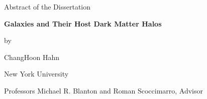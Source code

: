 \documentclass[12pt,letterpaper]{article}
\newcommand{\thesistitle}{Galaxies and Their Host Dark Matter Halos}
\newcommand{\thesisauthor}{ChangHoon Hahn}
\newcommand{\thesisadvisor}{Professors Michael R. Blanton and Roman Scoccimarro}
\begin{document}
  \begin{center}
    Abstract of the Dissertation\bigskip

    \textbf{\thesistitle}\bigskip

    by\bigskip

    \thesisauthor\bigskip

    New York University\bigskip

    \thesisadvisor, Advisor
  \end{center}
\bigskip


\end{document}
